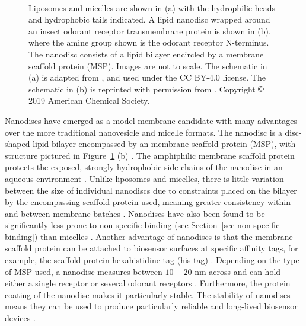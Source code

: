 \documentclass[
  a4paper,
]{scrbook}
\begin{document}
\begin{figure}
\begin{minipage}[t]{0.36\linewidth}
{{}

}

\end{minipage}%
%
\begin{minipage}[t]{0.01\linewidth}

{\centering 

~

}

\end{minipage}%

\caption[Diagrams showing the structure of various artificial
membranes.]{\label{fig-membranes}Liposomes and micelles are shown in (a)
with the hydrophilic heads and hydrophobic tails indicated. A lipid
nanodisc wrapped around an insect odorant receptor transmembrane protein
is shown in (b), where the amine group shown is the odorant receptor
N-terminus. The nanodisc consists of a lipid bilayer encircled by a
membrane scaffold protein (MSP). Images are not to scale. The schematic
in (a) is adapted from \autocite{Micelle}, and used under the CC BY-4.0
license. The schematic in (b) is reprinted with permission from
\autocite{Murugathas2019a}. Copyright \(\copyright\) 2019 American
Chemical Society.}

\end{figure}

Nanodiscs have emerged as a model membrane candidate with many
advantages over the more traditional nanovesicle and micelle formats.
The nanodisc is a disc-shaped lipid bilayer encompassed by an membrane
scaffold protein (MSP), with structure pictured in
Figure~\ref{fig-membranes} (b) \autocite{Nath2007,Bayburt2010,Yang2018}.
The amphiphilic membrane scaffold protein protects the exposed, strongly
hydrophobic side chains of the nanodisc in an aqueous environment
\autocite{Fruh2011,Yang2018}. Unlike liposomes and micelles, there is
little variation between the size of individual nanodiscs due to
constraints placed on the bilayer by the encompassing scaffold protein
used, meaning greater consistency within and between membrane batches
\autocite{Nath2007,Fruh2011}. Nanodiscs have also been found to be
significantly less prone to non-specific binding (see
Section~\ref{sec-non-specific-binding}) than micelles
\autocite{Fruh2011}. Another advantage of nanodiscs is that the membrane
scaffold protein can be attached to biosensor surfaces at specific
affinity tags, for example, the scaffold protein hexahistidine tag
(his-tag) \autocite{Bayburt2010,Fruh2011}. Depending on the type of MSP
used, a nanodisc measures between \(10 - 20\) nm across and can hold
either a single receptor or several odorant receptors
\autocite{Nath2007,Bayburt2010}. Furthermore, the protein coating of the
nanodisc makes it particularly stable. The stability of nanodiscs means
they can be used to produce particularly reliable and long-lived
biosensor devices \autocite{Goldsmith2011,Yang2018,Moon2020,Cheema2021}.
\end{document}
